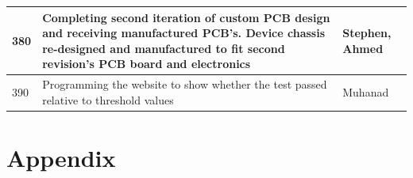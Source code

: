 \documentclass[12pt,titlepage]{article}
\begin{document}
\begin{table}[H]
\begin{tabular}{|p{2cm}|p{10cm}|p{2cm}|}
  380                          
  & Completing second iteration of custom PCB design and receiving manufactured PCB's. Device chassis re-designed and manufactured to fit second revision's PCB board and electronics
  & Stephen, Ahmed
  \newline                                
  \\ \hline

  390                                
  & Programming the website to show whether the test passed relative to threshold values
  & Muhanad 
  \newline    
  \\ \hline

  \end{tabular}
\end{table}

\newpage

\section{Appendix}
\end{document}
